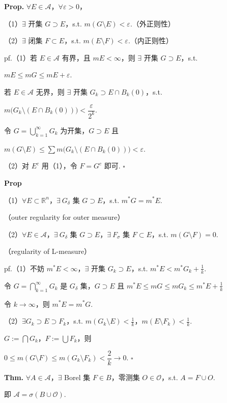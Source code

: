 \documentclass[11pt]{ctexart}
\theoremstyle{definition}
\begin{document}
\textbf{Prop.} $\forall E \in \mathscr{A}$，$\forall \varepsilon > 0$，

（1）$\exists$ 开集 $G \supset E$，s.t. $m(G \setminus E) < \varepsilon$.（外正则性）

（2）$\exists$ 闭集 $F \subset E$，s.t. $m(E \setminus F) < \varepsilon$.（内正则性）

pf.（1）若 $E \in \mathscr{A}$ 有界，且 $mE < \infty$，则 $\exists$ 开集 $G \supset E$，s.t.

$mE \leq mG \leq mE + \varepsilon$.

若 $E \in \mathscr{A}$ 无界，则 $\exists$ 开集 $G_k \supset E \cap B_k(0)$，s.t.

$m\big(G_k \setminus (E \cap B_k(0))\big) < \dfrac{\varepsilon}{2^k}$.

令 $G = \bigcup_{k=1}^{\infty} G_k$ 为开集，$G \supset E$ 且

$m(G \setminus E) \leq \sum m\big(G_k \setminus (E \cap B_k(0))\big) < \varepsilon$.

（2）对 $E^c$ 用（1），令 $F = G^c$ 即可. $\square$

\textbf{Prop}

（1）$\forall E \subset \mathbb{R}^n$，$\exists\ G_\delta$ 集 $G \supset E$，s.t. $m^*G = m^*E$.

（outer regularity for outer measure）

（2）$\forall E \in \mathscr{A}$，$\exists\ G_\delta$ 集 $G \supset E$，$\exists\ F_\sigma$ 集 $F \subset E$，s.t. $m(G \setminus F) = 0$.

（regularity of L-measure）

pf.（1）不妨 $m^*E < \infty$，$\exists$ 开集 $G_k \supset E$，s.t. $m^*E < m^*G_k + \tfrac{1}{k}$.

令 $G = \bigcap_{k=1}^{\infty} G_k$ 是 $G_\delta$ 集，$G \supset E$ 且 $m^*E \leq mG \leq mG_k \leq m^*E + \tfrac{1}{k}$

令 $k \to \infty$，则 $m^*E = m^*G$.

（2）$\exists G_k \supset E \supset F_k$，s.t. $m(G_k \setminus E) < \tfrac{1}{k}$，$m(E \setminus F_k) < \tfrac{1}{k}$.

$G := \bigcap G_k$，$F := \bigcup F_k$，则

$0 \leq m(G \setminus F) \leq m(G_k \setminus F_k) < \dfrac{2}{k} \to 0$. $\square$

\textbf{Thm.} $\forall A \in \mathscr{A}$，$\exists$ Borel 集 $F \in B$，零测集 $O \in \mathcal{O}$，s.t. $A = F \cup O$.

即 $\mathscr{A} = \sigma(B \cup \mathcal{O})$.
\end{document}
